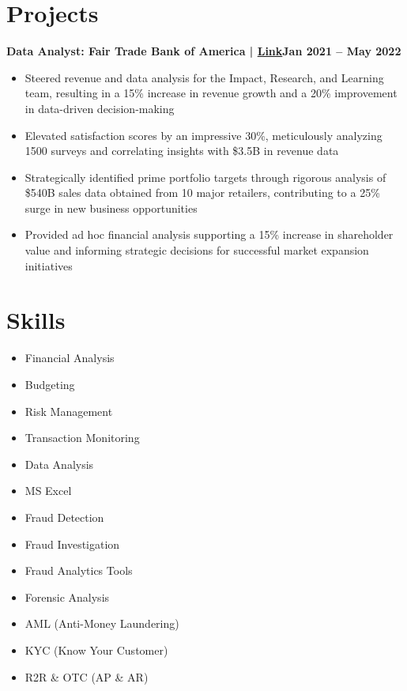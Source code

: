 \documentclass[11pt,a4paper]{article}
\newcommand{\entry}[2]{\noindent\textbf{#1}\hfill\textbf{#2}\par\vspace{2pt}}
\begin{document}
\section{Projects}
\normalsize
\entry{Data Analyst: Fair Trade Bank of America | \href{https://example.com}{Link}}{Jan 2021 -- May 2022}
\begin{itemize}
  \item Steered revenue and data analysis for the Impact, Research, and Learning team, resulting
        in a 15\% increase in revenue growth and a 20\% improvement in data-driven decision-making
  \item Elevated satisfaction scores by an impressive 30\%, meticulously analyzing 1500 surveys and
        correlating insights with \$3.5B in revenue data
  \item Strategically identified prime portfolio targets through rigorous analysis of \$540B sales
        data obtained from 10 major retailers, contributing to a 25\% surge in new business
        opportunities
  \item Provided ad hoc financial analysis supporting a 15\% increase in shareholder value and
        informing strategic decisions for successful market expansion initiatives
\end{itemize}

\section{Skills}
\normalsize
\begin{minipage}[t]{0.32\textwidth}
\begin{itemize}
  \item Financial Analysis
  \item Budgeting
  \item Risk Management
  \item Transaction Monitoring
  \item Data Analysis
\end{itemize}
\end{minipage}%
\begin{minipage}[t]{0.32\textwidth}
\begin{itemize}
  \item MS Excel
  \item Fraud Detection
  \item Fraud Investigation
  \item Fraud Analytics Tools
  \item Forensic Analysis
\end{itemize}
\end{minipage}%
\begin{minipage}[t]{0.34\textwidth}
\begin{itemize}
  \item AML (Anti-Money Laundering)
  \item KYC (Know Your Customer)
  \item R2R \& OTC (AP \& AR)
\end{itemize}
\end{minipage}
\end{document}
